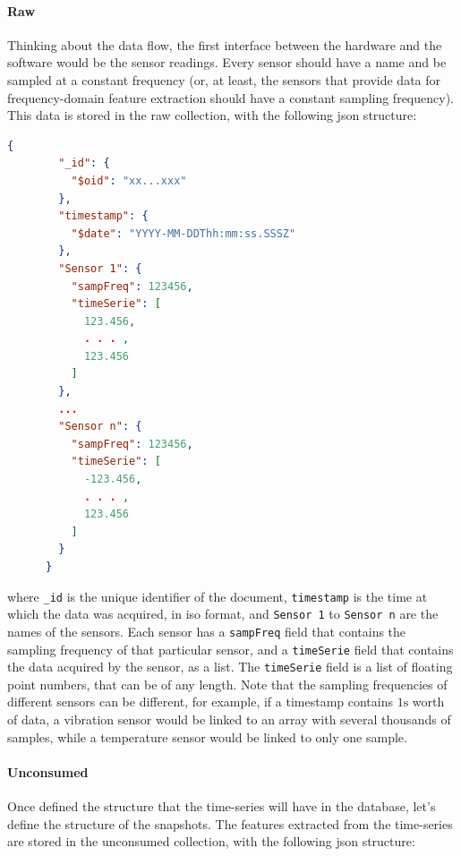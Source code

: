 \paragraph{Raw}
Thinking about the data flow, the first interface between the hardware and the software would be the sensor readings. Every sensor should have a name and be sampled at a constant frequency (or, at least, the sensors that provide data for frequency-domain feature extraction should have a constant sampling frequency). This data is stored in the {raw} collection, with the following \gls{json} structure:
\begin{lstlisting}[language=json,firstnumber=1]
    {
        "_id": {
          "$oid": "xx...xxx"
        },
        "timestamp": {
          "$date": "YYYY-MM-DDThh:mm:ss.SSSZ"
        },
        "Sensor 1": {
          "sampFreq": 123456,
          "timeSerie": [
            123.456,
            . . . ,
            123.456
          ]
        },
        ...
        "Sensor n": {
          "sampFreq": 123456,
          "timeSerie": [
            -123.456,
            . . . ,
            123.456
          ]
        }
      }
\end{lstlisting}
where \texttt{\_id} is the unique identifier of the document, \texttt{timestamp} is the time at which the data was acquired, in \gls{iso} format, and \texttt{Sensor 1} to \texttt{Sensor n} are the names of the sensors. Each sensor has a \texttt{sampFreq} field that contains the sampling frequency of that particular sensor, and a \texttt{timeSerie} field that contains the data acquired by the sensor, as a list. The \texttt{timeSerie} field is a list of floating point numbers, that can be of any length. Note that the sampling frequencies of different sensors can be different, for example, if a timestamp contains $1\si{\s}$ worth of data, a vibration sensor would be linked to an array with several thousands of samples, while a temperature sensor would be linked to only one sample.

\paragraph{Unconsumed}
Once defined the structure that the time-series will have in the database, let's define the structure of the snapshots. The features extracted from the time-series are stored in the {unconsumed} collection, with the following \gls{json} structure:

